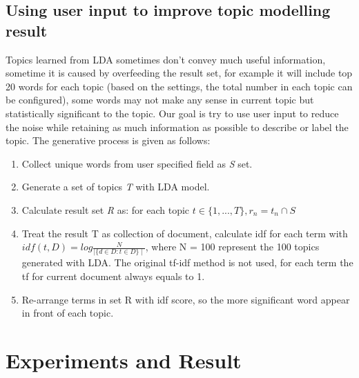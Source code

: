 \documentclass[11pt,twoside]{report}
\begin{document}
\section{Using user input to improve topic modelling result}

Topics learned from LDA sometimes don’t convey much useful information, sometime it is caused by overfeeding the result set, for example it will include top 20 words for each topic (based on the settings, the total number in each topic can be configured), some words may not make any sense in current topic but statistically significant to the topic. Our goal  is try to use user input to reduce the noise while retaining as much information as possible to describe or label the topic. The generative process is given as follows: 
\begin{enumerate}
\item Collect unique words from user specified field as \textit{S} set.
\item Generate a set of topics \textit{T} with LDA model.
\item Calculate result set \textit{R} as: for each topic $t\in\{1,...,T\}, r_n = t_n \cap S$
\item Treat the result T as collection of document, calculate idf for each term with $idf(t, D) = log\frac{N}{\mid \{d\in D : t\in D\}\mid}$, where N = 100 represent the 100 topics generated with LDA. The original tf-idf method is not used, for each term the tf for current document always equals to 1. 
\item Re-arrange terms in set R with idf score, so the more significant word appear in front of each topic.
\end{enumerate}

\chapter{Experiments and Result}
\end{document}
